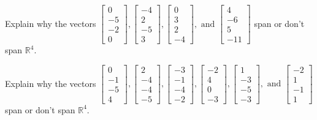 \documentclass{article}
\begin{document}

\begin{exerciseStatement}
    Explain why the vectors \(\left[\begin{array}{r}
0 \\
-5 \\
-2 \\
0
\end{array}\right] , \left[\begin{array}{r}
-4 \\
2 \\
-5 \\
3
\end{array}\right] , \left[\begin{array}{r}
0 \\
3 \\
2 \\
-4
\end{array}\right] , \text{ and } \left[\begin{array}{r}
4 \\
-6 \\
5 \\
-11
\end{array}\right]\) span or don't span \(\mathbb{R}^4\).



  
\end{exerciseStatement}

\begin{exerciseStatement}
    Explain why the vectors \(\left[\begin{array}{r}
0 \\
-1 \\
-5 \\
4
\end{array}\right] , \left[\begin{array}{r}
2 \\
-4 \\
-4 \\
-5
\end{array}\right] , \left[\begin{array}{r}
-3 \\
-1 \\
-4 \\
-2
\end{array}\right] , \left[\begin{array}{r}
-2 \\
4 \\
0 \\
-3
\end{array}\right] , \left[\begin{array}{r}
1 \\
-3 \\
-5 \\
-3
\end{array}\right] , \text{ and } \left[\begin{array}{r}
-2 \\
1 \\
-1 \\
1
\end{array}\right]\) span or don't span \(\mathbb{R}^4\).



  
\end{exerciseStatement}
\end{document}
